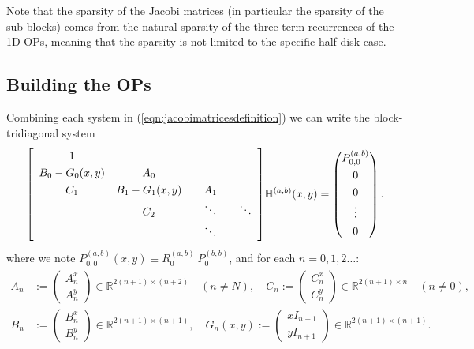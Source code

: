 \documentclass[11pt, oneside]{article}   	%
\newcommand{\R}{\mathbb{R}}
\newcommand{\hdop}{H}
\newcommand{\bighdop}{\mathbb{\hdop}}
\newcommand{\bighdopab}{\bighdop^{(a,b)}}
\newcommand{\genjac}{R}
\begin{document}
Note that the sparsity of the Jacobi matrices (in particular the sparsity of the sub-blocks) comes from the natural sparsity of the three-term recurrences of the 1D OPs, meaning that the sparsity is not limited to the specific half-disk case.




\subsection{Building the OPs} 

Combining each system in (\ref{eqn:jacobimatricesdefinition}) we can write the block-tridiagonal system
\begin{align*}
\renewcommand\arraystretch{1.3}
\mleft[
\begin{array}{cccc}
		1 & & & \\
		B_0-G_0(x,y) & A_0 & & \\
		C_1 & B_1-G_1(x,y) & \quad A_1 \quad & \\
		& C_2 & \ddots & \ddots \\
		& & \ddots &
\end{array}
\mright]
\bighdopab(x,y)
=
\begin{pmatrix}
	P^{(a,b)}_{0,0} \\ 0 \\ 0 \\ \vdots \\ 0 \\
\end{pmatrix}.
\end{align*}
where we note \(P^{(a,b)}_{0,0}(x,y) \equiv \genjac_0^{(a,b)} \: P_0^{(b,b)}\), and for each $n = 0,1,2\dots$:
\begin{align*}
A_n &:= \begin{pmatrix}
		A^x_n \\
		A^y_n
	    \end{pmatrix} \in \R^{2(n+1)\times(n+2)} \quad (n \ne N), \quad
C_n := \begin{pmatrix}
		C^x_n \\
		C^y_n
	    \end{pmatrix} \in \R^{2(n+1)\times n} \quad (n \ne 0), \nonumber \\
B_n &:= \begin{pmatrix}
		B^x_n \\
		B^y_n
	    \end{pmatrix} \in \R^{2(n+1)\times(n+1)}, \quad
G_n(x,y) := \begin{pmatrix}
		xI_{n+1} \\
		yI_{n+1}
	    \end{pmatrix} \in \R^{2(n+1)\times(n+1)}.
\end{align*}
 
\end{document}
